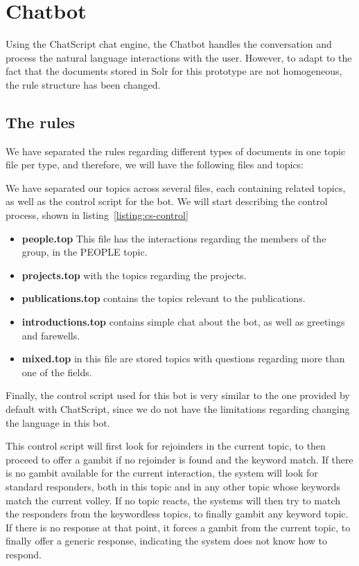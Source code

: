 \section{Chatbot}
\label{sec:chatbotgsi}

Using the ChatScript chat engine, the Chatbot handles the conversation and process the natural language interactions with the user. However, to adapt to the fact that the documents stored in Solr for this prototype are not homogeneous, the rule structure has been changed.

\subsection{The rules}

We have separated the rules regarding different types of documents in one topic file per type, and therefore, we will have the following files and topics:

We have separated our topics across several files, each containing related topics, as well as the control script for the bot. We will start describing the control process, shown in listing~\ref{listing:cs-control}


\begin{itemize}
 \item \textbf{people.top} This file has the interactions regarding the members of the group, in the PEOPLE topic.
 \item \textbf{projects.top} with the topics regarding the projects.
 \item \textbf{publications.top} contains the topics relevant to the publications.
 \item \textbf{introductions.top} contains simple chat about the bot, as well as greetings and farewells.
 \item \textbf{mixed.top} in this file are stored topics with questions regarding more than one of the fields.
\end{itemize}

Finally, the control script used for this bot is very similar to the one provided by default with ChatScript, since we do not have the limitations regarding changing the language in this bot.

This control script will first look for rejoinders in the current topic, to then proceed to offer a gambit if no rejoinder is found and the keyword match. If there is no gambit available for the current interaction, the system will look for standard responders, both in this topic and in any other topic whose keywords match the current volley. If no topic reacts, the systems will then try to match the responders from the keywordless topics, to finally gambit any keyword topic. If there is no response at that point, it forces a gambit from the current topic, to finally offer a generic response, indicating the system does not know how to respond.


